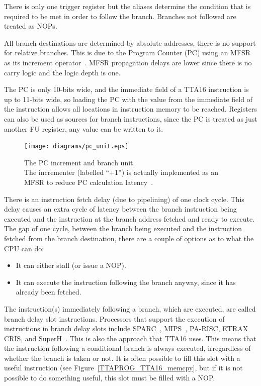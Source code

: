 There is only one trigger register but the aliases determine the condition
that is required to be met in order to follow the branch. Branches not followed
are treated as NOPs.

All branch destinations are determined by absolute addresses, there is no
support for relative branches. This is due to the Program Counter (PC) using an
MFSR as its increment operator~\cite{MFSR_List}. MFSR propagation delays are
lower since there is no carry logic and the logic depth is one.

The PC is only 10-bits wide, and the immediate field of a TTA16 instruction is
up to 11-bits wide, so loading the PC with the value from the immediate
field of the instruction allows all locations in instruction memory to be
reached. Registers can also be used as sources for branch instructions, since
the PC is treated as just another FU register, any value can be written to it.

\begin{figure}[h]
\begin{center}
\texttt{[image: diagrams/pc\_unit.eps]}
\caption[The PC increment and branch unit]{The PC increment and branch unit. \\
The incrementer (labelled ``+1'') is actually implemented as an MFSR to
reduce PC calculation latency~\cite{MFSR_List}.}
\label{CPU_PC_Unit}
\end{center}
\end{figure}

There is an instruction fetch delay (due to pipelining) of one clock cycle.
This delay causes an extra cycle of latency between the branch instruction being
executed and the instruction at the branch address fetched and ready to
execute. The gap of one cycle, between the branch being executed and the
instruction fetched from the branch destination, there are a couple of options
as to what the CPU can do:
\begin{itemize}
  \item It can either stall (or issue a NOP).
  \item It can execute the instruction following the branch anyway, since it has
already been fetched.
\end{itemize}

The instruction(s) immediately following a branch, which are executed, are called
branch delay slot instructions. Processors that support the execution of
instructions in branch delay slots include SPARC~\cite{SPARC_Arch},
MIPS~\cite{britton2004mal}, PA-RISC, ETRAX CRIS, and SuperH~\cite{SuperH}. This
is also the approach that TTA16 uses. This means that the instruction following a
conditional branch is always executed, irregardless of whether the branch is
taken or not. It is often possible to fill this slot with a useful instruction
(see Figure~\ref{TTAPROG_TTA16_memcpy}, but if it is not possible to do something
useful, this slot must be filled with a NOP.


